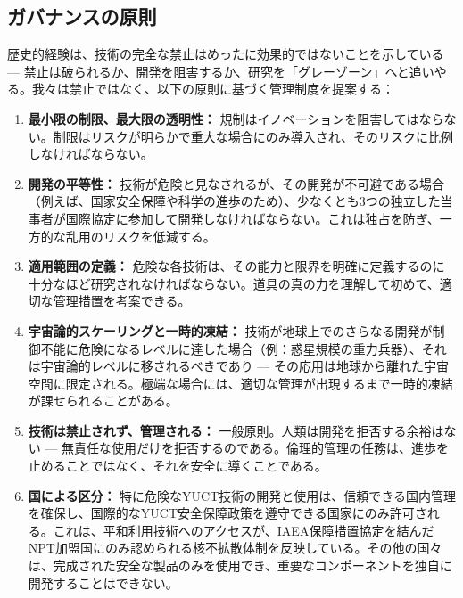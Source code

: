\documentclass[12pt,a4paper]{article}
\theoremstyle{remark}
\begin{document}
	\subsection{ガバナンスの原則}
	\label{subsec:principles}
	
	歴史的経験は、技術の完全な禁止はめったに効果的ではないことを示している — 禁止は破られるか、開発を阻害するか、研究を「グレーゾーン」へと追いやる。我々は禁止ではなく、以下の原則に基づく管理制度を提案する：
	
	\begin{enumerate}[leftmargin=*]
		\item \textbf{最小限の制限、最大限の透明性：} 規制はイノベーションを阻害してはならない。制限はリスクが明らかで重大な場合にのみ導入され、そのリスクに比例しなければならない。
		
		\item \textbf{開発の平等性：} 技術が危険と見なされるが、その開発が不可避である場合（例えば、国家安全保障や科学の進歩のため）、少なくとも3つの独立した当事者が国際協定に参加して開発しなければならない。これは独占を防ぎ、一方的な乱用のリスクを低減する。
		
		\item \textbf{適用範囲の定義：} 危険な各技術は、その能力と限界を明確に定義するのに十分なほど研究されなければならない。道具の真の力を理解して初めて、適切な管理措置を考案できる。
		
		\item \textbf{宇宙論的スケーリングと一時的凍結：} 技術が地球上でのさらなる開発が制御不能に危険になるレベルに達した場合（例：惑星規模の重力兵器）、それは宇宙論的レベルに移されるべきであり — その応用は地球から離れた宇宙空間に限定される。極端な場合には、適切な管理が出現するまで一時的凍結が課せられることがある。
		
		\item \textbf{技術は禁止されず、管理される：} 一般原則。人類は開発を拒否する余裕はない — 無責任な使用だけを拒否するのである。倫理的管理の任務は、進歩を止めることではなく、それを安全に導くことである。
		
		\item \textbf{国による区分：} 特に危険なYUCT技術の開発と使用は、信頼できる国内管理を確保し、国際的なYUCT安全保障政策を遵守できる国家にのみ許可される。これは、平和利用技術へのアクセスが、IAEA保障措置協定を結んだNPT加盟国にのみ認められる核不拡散体制を反映している。その他の国々は、完成された安全な製品のみを使用でき、重要なコンポーネントを独自に開発することはできない。
	\end{enumerate}
	
\end{document}
